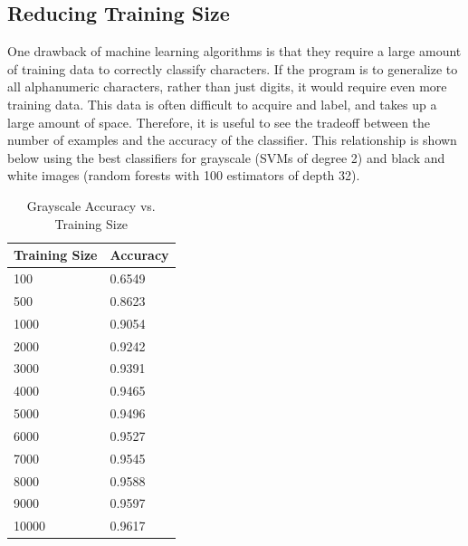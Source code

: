 \documentclass[12pt]{article}
\begin{document}
\subsection*{Reducing Training Size}
One drawback of machine learning algorithms is that they require a large amount of training data to correctly classify characters. If the program is to generalize to all alphanumeric characters, rather than just digits, it would require even more training data. This data is often difficult to acquire and label, and takes up a large amount of space. Therefore, it is useful to see the tradeoff between the number of examples and the accuracy of the classifier. This relationship is shown below using the best classifiers for grayscale (SVMs of degree 2) and black and white images (random forests with 100 estimators of depth 32).
\begin{table}[H]
\centering
\caption{Grayscale Accuracy vs. Training Size}
    \begin{tabular}{|l|l|}
    \hline
    Training Size & Accuracy \\ \hline
    100      & 0.6549   \\ \hline
    500      & 0.8623   \\ \hline
    1000      & 0.9054   \\ \hline
    2000      & 0.9242   \\ \hline
    3000      & 0.9391   \\ \hline
    4000      & 0.9465   \\ \hline
    5000      & 0.9496   \\ \hline
    6000      & 0.9527   \\ \hline
    7000      & 0.9545   \\ \hline
    8000      & 0.9588   \\ \hline
    9000      & 0.9597   \\ \hline
    10000      & 0.9617   \\ \hline
    \end{tabular}
\end{table}
\end{document}
